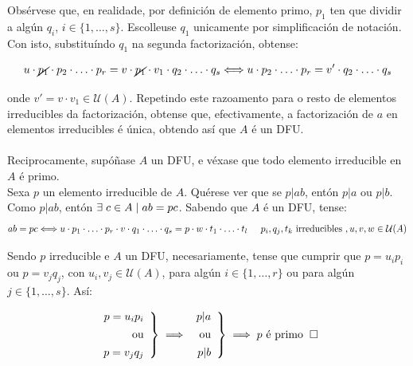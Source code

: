 \documentclass[twoside]{report}
\theoremstyle{mystyle}
\begin{document}
\noindent Obsérvese que, en realidade, por definición de elemento primo, $p_{1}$ ten que dividir a algún $q_{i}$, $i \in \{1, \ldots, s\}$. Escolleuse $q_{1}$ unicamente por simplificación de notación.\\

\noindent Con isto, substituíndo $q_{1}$ na segunda factorización, obtense:

$$u \cdot \cancel{p_{1}} \cdot p_{2} \cdot \ldots \cdot p_{r} = v \cdot \cancel{p_{1}} \cdot v_{1} \cdot q_{2} \cdot \ldots \cdot q_{s} \Longleftrightarrow u \cdot p_{2} \cdot \ldots \cdot p_{r} = v' \cdot q_{2} \cdot \ldots \cdot q_{s}$$

\noindent onde $v' = v \cdot v_{1} \in \mathcal{U}(A)$. Repetindo este razoamento para o resto de elementos irreducibles da factorización, obtense que, efectivamente, a factorización de $a$ en elementos irreducibles é única, obtendo así que $A$ é un DFU.\\

\noindent {}\\

\noindent Reciprocamente, supóñase $A$ un DFU, e véxase que todo elemento irreducible en $A$ é primo.\\

\noindent Sexa $p$ un elemento irreducible de $A$. Quérese ver que se $p|ab$, entón $p|a$ ou $p|b$. \\

\noindent Como $p|ab$, entón $\exists \hspace{1mm} c \in A \hspace{1mm} | \hspace{1mm} ab = pc$. Sabendo que $A$ é un DFU, tense:
$$ab = pc \Longleftrightarrow u \cdot p_{1} \cdot \ldots \cdot p_{r} \cdot v \cdot q_{1} \cdot \ldots \cdot q_{s} = p \cdot w \cdot t_{1} \cdot \ldots \cdot t_{l} \hspace{5mm} p_{i}, q_{j}, t_{k} \text{ irreducibles }, u,v,w \in \mathcal{U}(A)$$

\noindent Sendo $p$ irreducible e $A$ un DFU, necesariamente, tense que cumprir que $p = u_{i}p_{i}$ ou $p = v_{j}q_{j}$, con $u_{i}, v_{j} \in \mathcal{U}(A)$, para algún $i \in \{1,\ldots,r\}$ ou para algún $j \in \{1, \ldots, s\}$. Así:

    \[ 
    \left. \begin{array}{r} 
    p = u_{i}p_{i} \\[1ex]
    \text{ou} \\[1ex]
    p = v_{j}q_{j}
    \end{array} \right\}
    \implies 
    \left. \begin{array}{r} 
    p|a\\[1ex]
    \text{ou} \\[1ex]
    p|b
    \end{array} \right\}
    \implies p \text{ é primo} \hspace{2mm}  \square
    \]
    
\end{document}
